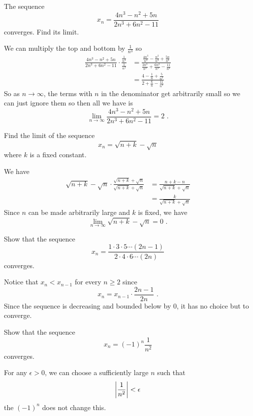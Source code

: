 \begin{exercise}
    The sequence 
    \[ x_{n} = \frac{4n^{3} -n^{2} +5n}{2n^{3} + 6n^{2} -11} \]
    converges. Find its limit.
\end{exercise}
\begin{solution}
    We can multiply the top and bottom by \( \frac{1}{n^{3}} \) so 
    \begin{align*}
        \frac{4n^{3} -n^{2} +5n}{2n^{3} + 6n^{2} -11} \cdot \frac{ \displaystyle\frac{1}{n^{3}} }{ \displaystyle\frac{1}{n^{3}}} &= \frac{ \displaystyle\frac{4n^{3}}{n^{3}} -  \frac{n^{2}}{n^{3}} +  \frac{5n}{n^{3}}}{ \displaystyle\frac{2n^{3}}{n^{3}} +  \frac{6n^{2}}{n^{3}} -  \frac{11}{n^{3}}} \\
        &= \frac{\displaystyle 4 - \frac{1}{n } + \frac{5}{n^{2}}}{\displaystyle2 + \frac{6}{n} - \frac{11}{n^{3}}}
    \end{align*}
    So as \( n \to \infty \), the terms with \( n \) in the denominator get arbitrarily small so we can just ignore them so then all we have is 
    \[ \boxed{\lim_{n \to \infty}  \frac{4n^{3} -n^{2} +5n}{2n^{3} + 6n^{2} -11} = 2 \text{ .}}\]
\end{solution}

\begin{exercise}
    Find the limit of the sequence 
    \[ x_{n} = \sqrt{n + k} - \sqrt{n}  \] where \( k \) is a fixed constant. 
\end{exercise}
\begin{solution}
    We have 
    \begin{align*}
        \sqrt{n+k} - \sqrt{n} \cdot \frac{\sqrt{n+k} + \sqrt{n}}{\sqrt{n+k} + \sqrt{n}} &= \frac{n+k -n}{\sqrt{n+k} + \sqrt{n}} \\
        &= \frac{k}{ \sqrt{n+k} + \sqrt{n}}
    \end{align*}
    Since \( n \) can be made arbitrarily large and \( k \) is fixed, we have 
    \[ \boxed{\lim_{n \to \infty}\sqrt{n + k} - \sqrt{n} = 0 \text{ .}} \]
\end{solution}

\begin{exercise}
    Show that the sequence 
    \[ x_{n} = \frac{1 \cdot 3 \cdot 5 \cdots (2n-1)}{2 \cdot 4 \cdot 6 \cdots (2n)} \]
    converges.
\end{exercise}
\begin{solution}
    Notice that \( x_{n} < x_{n-1} \) for every \( n \ge 2 \) since 
    \[ x_{n} = x_{n-1} \cdot \frac{2n-1}{2n} \text{ .}\]
    Since the sequence is decreasing and bounded below by \( 0 \), it has no choice but to converge. 
\end{solution}

\begin{exercise}
    Show that the sequence 
    \[ x_{n} = \left( -1  \right)^{n} \frac{1}{n^{2}} \]
    converges.
\end{exercise}
\begin{solution}
    For any \( \epsilon > 0 \), we can choose a sufficiently large \( n \) such that 
    \[ \abs{\frac{1}{n^{2}}} < \epsilon \]
    the \( (-1)^{n} \) does not change this. 
\end{solution}
